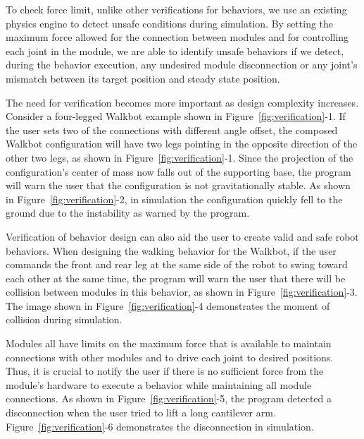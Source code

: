 \documentclass[graybox]{svmult}
\newcommand{\TODO}[1]{ {\bf \textcolor{red}{TODO:} #1 }}
\begin{document}
To check force limit, unlike other verifications for behaviors, we use an existing physics engine to detect unsafe conditions during simulation. By setting the maximum force allowed for the connection between modules and for controlling each joint in the module, we are able to identify unsafe behaviors if we detect, during the behavior execution, any undesired module disconnection or any joint's mismatch between its target position and steady state position.


The need for verification becomes more important as design complexity increases. Consider a four-legged Walkbot example shown in Figure~\ref{fig:verification}-1. If the user sets two of the connections with different angle offset, the composed Walkbot configuration will have two legs pointing in the opposite direction of the other two legs, as shown in Figure~\ref{fig:verification}-1. Since the projection of the configuration's center of mass now falls out of the supporting base, the program will warn the user that the configuration is not gravitationally stable. As shown in Figure~\ref{fig:verification}-2, in simulation the configuration quickly fell to the ground due to the instability as warned by the program. 

Verification of behavior design can also aid the user to create valid and safe robot behaviors. When designing the walking behavior for the Walkbot, if the user commands the front and rear leg at the same side of the robot to swing toward each other at the same time, the program will warn the user that there will be collision between modules in this behavior, as shown in Figure~\ref{fig:verification}-3. The image shown in Figure~\ref{fig:verification}-4 demonstrates the moment of collision during simulation.

Modules all have limits on the maximum force that is available to maintain connections with other modules and to drive each joint to desired positions. Thus, it is crucial to notify the user if there is no sufficient force from the module's hardware to execute a behavior while maintaining all module connections. 
As shown in Figure~\ref{fig:verification}-5, the program detected a disconnection when the user tried to lift a long cantilever arm. Figure~\ref{fig:verification}-6 demonstrates the disconnection in simulation.
 
\end{document}
